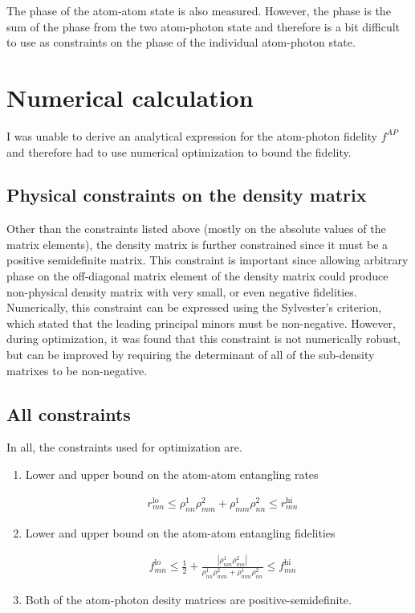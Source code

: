 \documentclass[10pt,fleqn]{article}
\newcommand{\eqar}[1]
{
  \begin{align}
    #1
  \end{align}
}
\newcommand{\abs}[1]{{\left|{#1}\right|}}
\begin{document}
The phase of the atom-atom state is also measured. However, the phase is the sum of the phase from the two atom-photon state and therefore is a bit difficult to use as constraints on the phase of the individual atom-photon state.

\section{Numerical calculation}
I was unable to derive an analytical expression for the atom-photon fidelity $f^{AP}$ and therefore had to use numerical optimization to bound the fidelity.

\subsection{Physical constraints on the density matrix}
Other than the constraints listed above (mostly on the absolute values of the matrix elements), the density matrix is further constrained since it must be a positive semidefinite matrix.
This constraint is important since allowing arbitrary phase on the off-diagonal matrix element of the density matrix could produce non-physical density matrix with very small, or even negative fidelities.
Numerically, this constraint can be expressed using the Sylvester's criterion, which stated that the leading principal minors must be non-negative.
However, during optimization, it was found that this constraint is not numerically robust, but can be improved by requiring the determinant of all of the sub-density matrixes to be non-negative.

\subsection{All constraints}
In all, the constraints used for optimization are.

\begin{enumerate}
\item Lower and upper bound on the atom-atom entangling rates
  \eqar{
    &r_{mn}^{\mathrm{lo}}\leqslant \rho^1_{nn}\rho^2_{mm}+\rho^1_{mm}\rho^2_{nn} \leqslant r_{mn}^{\mathrm{hi}}
  }
\item Lower and upper bound on the atom-atom entangling fidelities
  \eqar{
    &f_{mn}^{\mathrm{lo}}\leqslant \frac12+\frac{\abs{\rho^1_{nm}\rho^2_{mn}}}{\rho^1_{nn}\rho^2_{mm}+\rho^1_{mm}\rho^2_{nn}} \leqslant f_{mn}^{\mathrm{hi}}
  }
\item Both of the atom-photon desity matrices are positive-semidefinite.
\end{enumerate}
\end{document}

